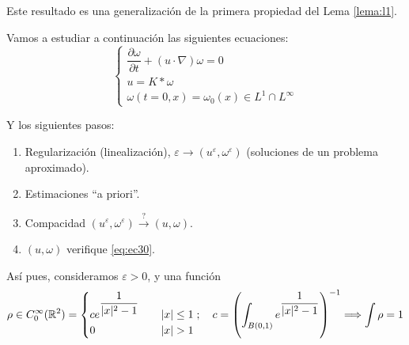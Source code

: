 \begin{observacion}
    Este resultado es una generalización de la primera propiedad del Lema \ref{lema:l1}.
\end{observacion}


Vamos a estudiar a continuación las siguientes ecuaciones:
\begin{equation}\label{eq:ec30}
    \begin{cases}
        \dfrac{\partial \omega}{\partial t} + (u \cdot \nabla) \omega = 0 \\
        u = K \ast \omega \\
        \omega(t=0,x) = \omega_0(x) \in L^1 \cap L^\infty
    \end{cases}
\end{equation}

Y los siguientes pasos:
\begin{enumerate}
    \item Regularización (linealización), $\varepsilon \to (u^\varepsilon, \omega^\varepsilon)$ (soluciones de un problema aproximado).
    \item Estimaciones ``a priori''.
    \item Compacidad $(u^\varepsilon, \omega^\varepsilon) \stackrel{?}{\to} (u,\omega)$.
    \item $(u, \omega)$ verifique \eqref{eq:ec30}.
\end{enumerate}

Así pues, consideramos $\varepsilon > 0$, y una función 
$$\rho \in C_0^\infty(\mathbb{R}^2) = \begin{cases}
    c e^{\dfrac{1}{|x|^2 - 1}} \quad& |x| \leq 1 \\
    0 \quad& |x| > 1
\end{cases}; \quad c = \left( \int_{B(0,1)} e^{\dfrac{1}{|x|^2 - 1}}  \right)^{-1} \Longrightarrow \int \rho = 1$$

